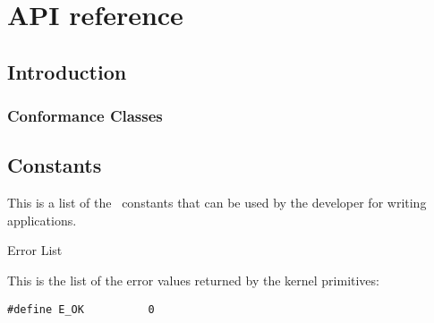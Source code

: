\chapter{API reference}
\label{sec:api_reference}

\section{Introduction}




\subsection{Conformance Classes}





\pagebreak

\section{Constants}
\label{sec:constants}

This is a list of the \ee\ constants that can be used by the developer
for writing applications.

\begin{constant}{Error List}
  \begin{constantdescription}
    This is the list of the error values returned by the kernel primitives:
    \begin {lstlisting}
#define E_OK          0
    \end{lstlisting}
  \end{constantdescription}
\end{constant}

